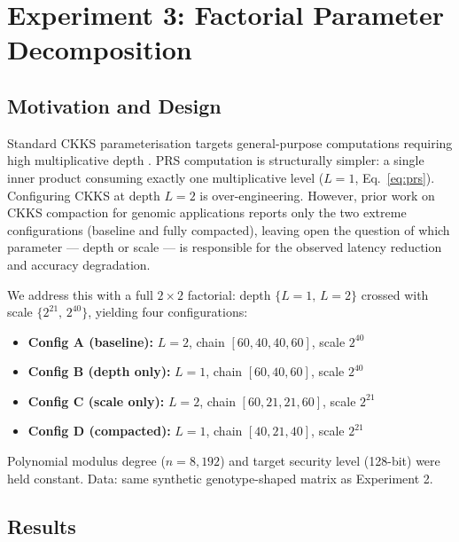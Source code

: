 \documentclass[conference]{IEEEtran}
\begin{document}
\section{Experiment 3: Factorial Parameter Decomposition}

\subsection{Motivation and Design}

Standard CKKS parameterisation targets general-purpose computations requiring
high multiplicative depth \cite{cheon2019}. PRS computation is structurally
simpler: a single inner product consuming exactly one multiplicative level
($L=1$, Eq.~\ref{eq:prs}). Configuring CKKS at depth $L=2$ is over-engineering.
However, prior work on CKKS compaction for genomic applications \cite{blatt2020,
gursoy2022imputation} reports only the two extreme configurations (baseline and
fully compacted), leaving open the question of which parameter --- depth or
scale --- is responsible for the observed latency reduction and accuracy
degradation.

We address this with a full $2\times2$ factorial: depth $\{L=1,\,L=2\}$
crossed with scale $\{2^{21},\,2^{40}\}$, yielding four configurations:

\begin{itemize}
    \item \textbf{Config A (baseline):} $L=2$, chain $[60,40,40,60]$, scale $2^{40}$
    \item \textbf{Config B (depth only):} $L=1$, chain $[60,40,60]$, scale $2^{40}$
    \item \textbf{Config C (scale only):} $L=2$, chain $[60,21,21,60]$, scale $2^{21}$
    \item \textbf{Config D (compacted):} $L=1$, chain $[40,21,40]$, scale $2^{21}$
\end{itemize}

Polynomial modulus degree ($n=8{,}192$) and target security level (128-bit)
were held constant. Data: same synthetic genotype-shaped matrix as Experiment 2.

\subsection{Results}
\end{document}
